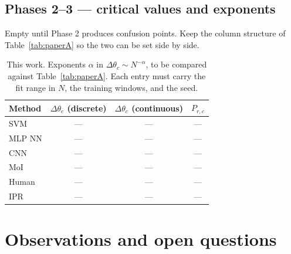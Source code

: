 \documentclass[11pt]{article}
\newcommand{\dthetac}{\Delta\theta_{c}}             %
\newcommand{\Prandc}{P_{r,c}}                       %
\begin{document}
\subsection{Phases 2--3 --- critical values and exponents}

Empty until Phase 2 produces confusion points. Keep the column structure of
Table~\ref{tab:paperA} so the two can be set side by side.

\begin{table}[h]
\centering
\begin{tabular}{lccc}
\toprule
\textbf{Method} & $\dthetac$ (discrete) & $\dthetac$ (continuous) & $\Prandc$ \\
\midrule
SVM    & --- & --- & --- \\
MLP NN & --- & --- & --- \\
CNN    & --- & --- & --- \\
MoI    & --- & --- & --- \\
Human  & --- & --- & --- \\
IPR    & --- & --- & --- \\
\bottomrule
\end{tabular}
\caption{This work. Exponents $\alpha$ in $\dthetac \sim N^{-\alpha}$, to be
compared against Table~\ref{tab:paperA}. Each entry must carry the fit range
in $N$, the training windows, and the seed.}
\label{tab:exponents}
\end{table}

\section{Observations and open questions}
\label{sec:observations}
\end{document}
